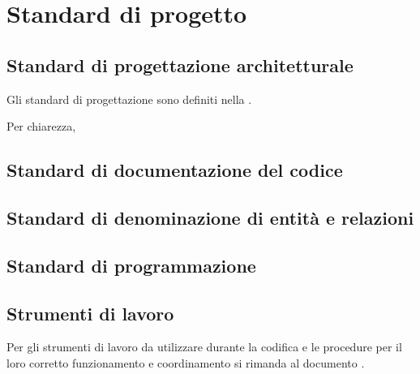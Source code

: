 \section{Standard di progetto}

\subsection{Standard di progettazione architetturale}
Gli standard di progettazione sono definiti nella \SpecificaTecnica{}.

Per chiarezza, %

\subsection{Standard di documentazione del codice}

\subsection{Standard di denominazione di entità e relazioni}

\subsection{Standard di programmazione}

\subsection{Strumenti di lavoro}
	Per gli strumenti di lavoro da utilizzare durante la codifica e le procedure per il loro corretto funzionamento e coordinamento si rimanda al documento \NormeDiProgetto{}.